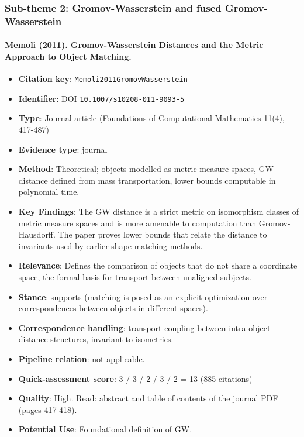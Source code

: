\documentclass[journal,onecolumn]{IEEEtran}
\begin{document}
\subsubsection{Sub-theme 2: Gromov-Wasserstein and fused Gromov-Wasserstein}

\paragraph{Memoli (2011). Gromov-Wasserstein Distances and the Metric Approach to Object Matching.~\cite{Memoli2011GromovWasserstein}}\mbox{}

\begin{itemize}

\item{} \textbf{Citation key}: \texttt{Memoli2011GromovWasserstein}

\item{} \textbf{Identifier}: DOI \nolinkurl{10.1007/s10208-011-9093-5}

\item{} \textbf{Type}: Journal article (Foundations of Computational Mathematics 11(4), 417-487)

\item{} \textbf{Evidence type}: journal

\item{} \textbf{Method}: Theoretical; objects modelled as metric measure spaces, GW distance defined from mass transportation, lower bounds computable in polynomial time.

\item{} \textbf{Key Findings}: The GW distance is a strict metric on isomorphism classes of metric measure spaces and is more amenable to computation than Gromov-Hausdorff. The paper proves lower bounds that relate the distance to invariants used by earlier shape-matching methods.

\item{} \textbf{Relevance}: Defines the comparison of objects that do not share a coordinate space, the formal basis for transport between unaligned subjects.

\item{} \textbf{Stance}: supports (matching is posed as an explicit optimization over correspondences between objects in different spaces).

\item{} \textbf{Correspondence handling}: transport coupling between intra-object distance structures, invariant to isometries.

\item{} \textbf{Pipeline relation}: not applicable.

\item{} \textbf{Quick-assessment score}: 3 / 3 / 2 / 3 / 2 = 13 (885 citations)

\item{} \textbf{Quality}: High. Read: abstract and table of contents of the journal PDF (pages 417-418).

\item{} \textbf{Potential Use}: Foundational definition of GW.

\end{itemize}
\end{document}
